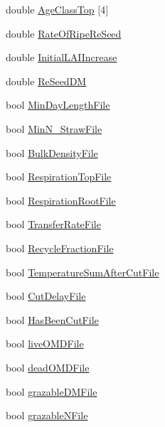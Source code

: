 \begin{DoxyCompactItemize}
double \hyperlink{classcrop_parameters_ryegrass_a37339732ab611d3f577ac56998e10029}{AgeClassTop} \mbox{[}4\mbox{]}
\item 
double \hyperlink{classcrop_parameters_ryegrass_a62705043d74b53ffef9f4d79f1da1ef9}{RateOfRipeReSeed}
\item 
double \hyperlink{classcrop_parameters_ryegrass_a946296ebe472d83c2459be22216772fa}{InitialLAIIncrease}
\item 
double \hyperlink{classcrop_parameters_ryegrass_a1a06ee4c8ef9eeebe95d09bcd426e0a8}{ReSeedDM}
\item 
bool \hyperlink{classcrop_parameters_ryegrass_a2c43a20ff59bd0fc6a6a7ec616c35afe}{MinDayLengthFile}
\item 
bool \hyperlink{classcrop_parameters_ryegrass_adbaf8f8a7584d1e1c7f6b7b6898d72d3}{MinN\_\-StrawFile}
\item 
bool \hyperlink{classcrop_parameters_ryegrass_a5ae03d579c4511ede5676162b63a8647}{BulkDensityFile}
\item 
bool \hyperlink{classcrop_parameters_ryegrass_abe37c4d502b9c0a8c290d05185c1c90b}{RespirationTopFile}
\item 
bool \hyperlink{classcrop_parameters_ryegrass_ac5d91c76ffd1ce8756db8b0357e9e0d0}{RespirationRootFile}
\item 
bool \hyperlink{classcrop_parameters_ryegrass_aaeada42b14662392bd912f4b432c0806}{TransferRateFile}
\item 
bool \hyperlink{classcrop_parameters_ryegrass_ab222bee691926eb66e4268181661897a}{RecycleFractionFile}
\item 
bool \hyperlink{classcrop_parameters_ryegrass_abfe8ad701f4fc7d66e87ffe517e54fa9}{TemperatureSumAfterCutFile}
\item 
bool \hyperlink{classcrop_parameters_ryegrass_a2c06d036332207868494c70f376cc18a}{CutDelayFile}
\item 
bool \hyperlink{classcrop_parameters_ryegrass_a5de0cc6836acd2536cae705f2a2481ef}{HasBeenCutFile}
\item 
bool \hyperlink{classcrop_parameters_ryegrass_a456b2c8c071537c8150b13ae33d747b8}{liveOMDFile}
\item 
bool \hyperlink{classcrop_parameters_ryegrass_a86a092c1667c6a656ee4aeef863aad52}{deadOMDFile}
\item 
bool \hyperlink{classcrop_parameters_ryegrass_a7b8e6813d8fdae3779e5106bf06686a1}{grazableDMFile}
\item 
bool \hyperlink{classcrop_parameters_ryegrass_af294328d01ea7925eb202d39f93a88ea}{grazableNFile}
\item 

\end{DoxyCompactItemize}
